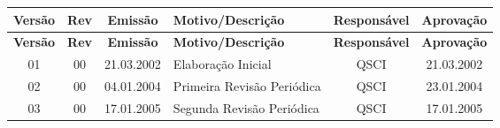 \begin{longtable}{|c|c|c|p{6cm}|c|c|}
\hline
\textbf{Versão} & \textbf{Rev} & \textbf{Emissão} & \textbf{Motivo/Descrição} & \textbf{Responsável} & \textbf{Aprovação} \\
\hline
\endfirsthead

\hline
\textbf{Versão} & \textbf{Rev} & \textbf{Emissão} & \textbf{Motivo/Descrição} & \textbf{Responsável} & \textbf{Aprovação} \\
\hline
\endhead

\hline
\endfoot

01 & 00 & 21.03.2002 & Elaboração Inicial & QSCI & 21.03.2002 \\
\hline
02 & 00 & 04.01.2004 & Primeira Revisão Periódica & QSCI & 23.01.2004 \\
\hline
03 & 00 & 17.01.2005 & Segunda Revisão Periódica & QSCI & 17.01.2005 \\
\hline

\end{longtable}